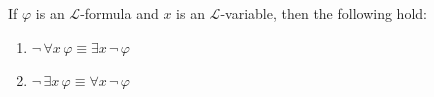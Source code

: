 \begin{thm}
     \label{logical-equivalence:negated-quantified-formulas}
    If \( \varphi \) is an \( \mathcal{L} \)-formula and \( x \) is an \( \mathcal{L} \)-variable, then the following hold:
    \begin{enumerate}[topsep=2pt,label=\textup{\texttt{(\alph*)}}]
        \item \( \lnot \, \forall x \, \varphi \equiv \exists x \, \lnot \, \varphi \)  \label{enum:negated-universal-quantifier}
        \item \( \lnot \, \exists x \, \varphi \equiv \forall x \, \lnot \, \varphi \)  \label{enum:negated-existential-quantifier}
    \end{enumerate}
\end{thm}

